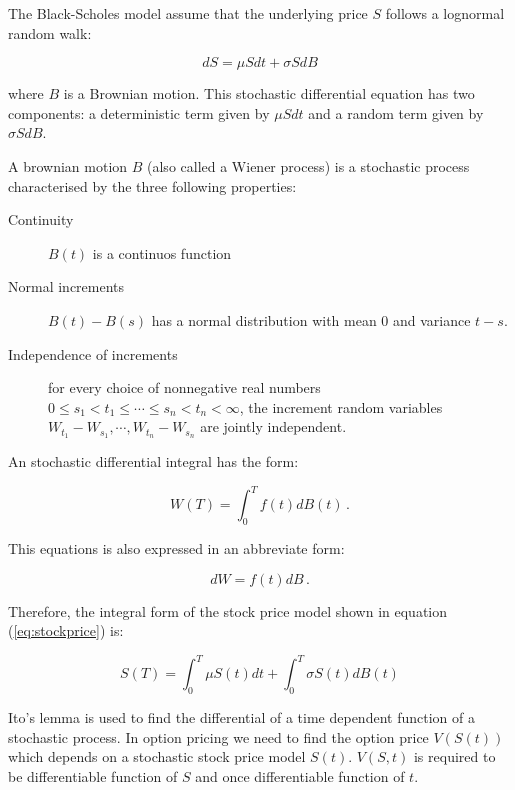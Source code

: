 The Black-Scholes model assume that the underlying price $S$ follows a lognormal random walk:

\begin{equation}\label{eq:stockprice}
dS = \mu S dt + \sigma S dB
\end{equation}

\noindent where $B$ is a Brownian motion. This stochastic differential equation
has two components: a deterministic term given by $\mu S dt$ and a random term
given by $\sigma S dB$.

A brownian motion $B$ (also called a Wiener process) is a stochastic process
characterised by the three following properties:

\begin{description}
\item[Continuity] $B(t)$ is a continuos function
\item[Normal increments]  $B(t)-B(s)$ has a normal distribution with mean $0$
and variance $t-s$.
\item[Independence of increments] for every choice of nonnegative real numbers
$0 \leq s_1 <  t_1 \leq \cdots \leq s_n < t_n < \infty$, the increment random
variables $W_{t_1} - W_{s_1}, \cdots, W_{t_n} - W_{s_n}$ are jointly
independent.
\end{description}

An stochastic differential integral has the form:


\begin{equation}
W(T)=\int_0^T f(t)dB(t) \, .
\end{equation}

\noindent This equations is also expressed in an abbreviate form:

\begin{equation}
dW = f(t) dB \, .
\end{equation}

\noindent Therefore, the integral form of the stock price model shown in
equation (\ref{eq:stockprice}) is:

\begin{equation}
S(T)=\int_0^T \mu S(t) dt + \int_0^T \sigma S(t) dB(t)
\end{equation}


Ito's lemma is used to find the differential of a time dependent function of a
stochastic process. In option pricing we need to find the option price $V(S(t))$
which depends on a stochastic stock price model $S(t)$.  $V(S,t)$ is required to
be  differentiable function of $S$ and once differentiable function of $t$.

